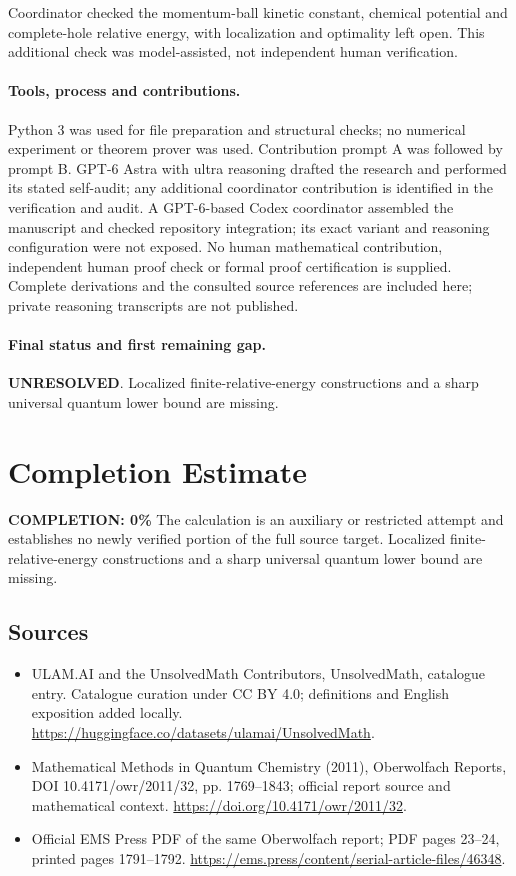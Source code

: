 \documentclass[11pt]{article}
\begin{document}
Coordinator checked the momentum-ball kinetic constant, chemical potential and complete-hole relative energy, with localization and optimality left open. This additional check was model-assisted, not independent human verification.

\paragraph{Tools, process and contributions.}
Python 3 was used for file preparation and structural checks; no numerical experiment or theorem prover was used. Contribution prompt A was followed by prompt B. GPT-6 Astra with ultra reasoning drafted the research and performed its stated self-audit; any additional coordinator contribution is identified in the verification and audit. A GPT-6-based Codex coordinator assembled the manuscript and checked repository integration; its exact variant and reasoning configuration were not exposed. No human mathematical contribution, independent human proof check or formal proof certification is supplied. Complete derivations and the consulted source references are included here; private reasoning transcripts are not published.

\paragraph{Final status and first remaining gap.}
\textbf{UNRESOLVED}. Localized finite-relative-energy constructions and a sharp universal quantum lower bound are missing.

\section{Completion Estimate}
\noindent\textbf{COMPLETION: 0\%}
The calculation is an auxiliary or restricted attempt and establishes no newly verified portion of the full source target. Localized finite-relative-energy constructions and a sharp universal quantum lower bound are missing.

\subsection{Sources}
\begin{itemize}
\item[\hypertarget{source:statement:1}{S1}] ULAM.AI and the UnsolvedMath Contributors, UnsolvedMath, catalogue entry. Catalogue curation under CC BY 4.0; definitions and English exposition added locally.
\url{https://huggingface.co/datasets/ulamai/UnsolvedMath}.
\item[\hypertarget{source:statement:2}{S2}] Mathematical Methods in Quantum Chemistry (2011), Oberwolfach Reports, DOI 10.4171/owr/2011/32, pp. 1769--1843; official report source and mathematical context.
\url{https://doi.org/10.4171/owr/2011/32}.
\item[\hypertarget{source:statement:3}{S3}] Official EMS Press PDF of the same Oberwolfach report; PDF pages 23--24, printed pages 1791--1792.
\url{https://ems.press/content/serial-article-files/46348}.
\end{itemize}
\label{end:statement}
\end{document}
